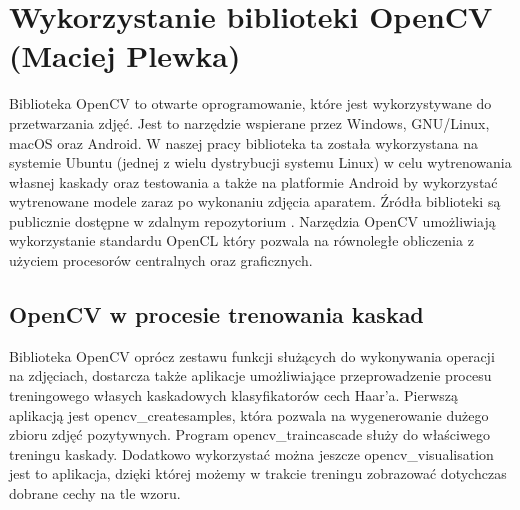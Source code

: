 \section{Wykorzystanie biblioteki OpenCV (Maciej Plewka)}\label{sec:opencv}
Biblioteka OpenCV to otwarte oprogramowanie, które jest wykorzystywane do przetwarzania zdjęć. Jest to narzędzie wspierane przez Windows, GNU/Linux, macOS oraz Android. W naszej pracy biblioteka ta została wykorzystana na systemie Ubuntu (jednej z wielu dystrybucji systemu Linux) w celu wytrenowania własnej kaskady oraz testowania a także na platformie Android by wykorzystać wytrenowane modele zaraz po wykonaniu zdjęcia aparatem. Źródła biblioteki są publicznie dostępne w zdalnym repozytorium \cite{OpenCVSource}. Narzędzia OpenCV umożliwiają wykorzystanie standardu OpenCL który pozwala na równoległe obliczenia z użyciem procesorów centralnych oraz graficznych.


\subsection{OpenCV w procesie trenowania kaskad}

Biblioteka OpenCV oprócz zestawu funkcji służących do wykonywania operacji na zdjęciach, dostarcza także aplikacje umożliwiające przeprowadzenie procesu treningowego własych kaskadowych klasyfikatorów cech Haar'a. Pierwszą aplikacją jest opencv\_createsamples, która pozwala na wygenerowanie dużego zbioru zdjęć pozytywnych. Program opencv\_traincascade służy do właściwego treningu kaskady. Dodatkowo wykorzystać można jeszcze opencv\_visualisation jest to aplikacja, dzięki której możemy w trakcie treningu zobrazować dotychczas dobrane cechy na tle wzoru.

